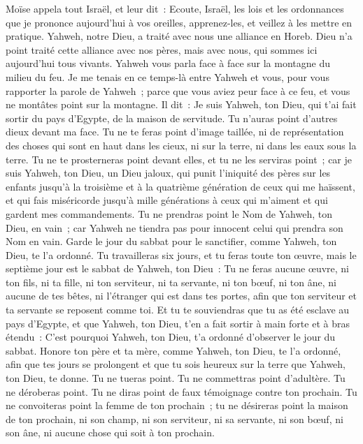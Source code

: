 \begin{multicols}{2}
\VerseOne{}Moïse appela tout Israël, et leur dit~: Ecoute, Israël, les lois et les ordonnances que je prononce aujourd'hui à vos oreilles, apprenez-les, et veillez à les mettre en pratique.
Yahweh, notre Dieu, a traité avec nous une alliance en Horeb.
Dieu n'a point traité cette alliance avec nos pères, mais avec nous, qui sommes ici aujourd'hui tous vivants.
Yahweh vous parla face à face sur la montagne du milieu du feu.
Je me tenais en ce temps-là entre Yahweh et vous, pour vous rapporter la parole de Yahweh~; parce que vous aviez peur face à ce feu, et vous ne montâtes point sur la montagne. Il dit~:
Je suis Yahweh, ton Dieu, qui t'ai fait sortir du pays d'Egypte, de la maison de servitude.
Tu n'auras point d'autres dieux devant ma face.
Tu ne te feras point d'image taillée, ni de représentation des choses qui sont en haut dans les cieux, ni sur la terre, ni dans les eaux sous la terre.
Tu ne te prosterneras point devant elles, et tu ne les serviras point~; car je suis Yahweh, ton Dieu, un Dieu jaloux, qui punit l'iniquité des pères sur les enfants jusqu'à la troisième et à la quatrième génération de ceux qui me haïssent,
et qui fais miséricorde jusqu'à mille générations à ceux qui m'aiment et qui gardent mes commandements.
Tu ne prendras point le Nom de Yahweh, ton Dieu, en vain~; car Yahweh ne tiendra pas pour innocent celui qui prendra son Nom en vain.
Garde le jour du sabbat pour le sanctifier, comme Yahweh, ton Dieu, te l'a ordonné.
Tu travailleras six jours, et tu feras toute ton œuvre,
mais le septième jour est le sabbat de Yahweh, ton Dieu~: Tu ne feras aucune œuvre, ni ton fils, ni ta fille, ni ton serviteur, ni ta servante, ni ton bœuf, ni ton âne, ni aucune de tes bêtes, ni l'étranger qui est dans tes portes, afin que ton serviteur et ta servante se reposent comme toi.
Et tu te souviendras que tu as été esclave au pays d'Egypte, et que Yahweh, ton Dieu, t'en a fait sortir à main forte et à bras étendu~: C'est pourquoi Yahweh, ton Dieu, t'a ordonné d'observer le jour du sabbat.
Honore ton père et ta mère, comme Yahweh, ton Dieu, te l'a ordonné, afin que tes jours se prolongent et que tu sois heureux sur la terre que Yahweh, ton Dieu, te donne.
Tu ne tueras point.
Tu ne commettras point d'adultère.
Tu ne déroberas point.
Tu ne diras point de faux témoignage contre ton prochain.
Tu ne convoiteras point la femme de ton prochain~; tu ne désireras point la maison de ton prochain, ni son champ, ni son serviteur, ni sa servante, ni son bœuf, ni son âne, ni aucune chose qui soit à ton prochain.

\end{multicols}

